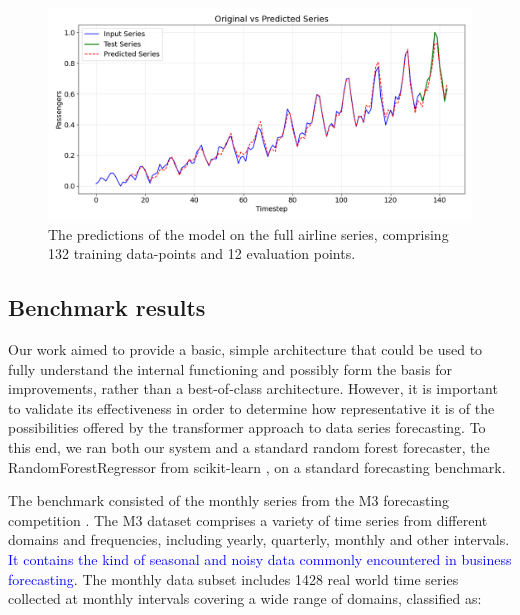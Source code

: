 \documentclass[algorithms,article,submit,pdftex,moreauthors]{Definitions/mdpi}
\begin{document}
\begin{figure}
	\centering
	\includegraphics[width=1.0\linewidth]{airlines.png}
	\caption{The predictions of the model on the full airline series, comprising 132 training data-points and 12 evaluation points.}
	\label{fig:airlines}
\end{figure}

\subsection{Benchmark results} \label{subsec:benchmark}

Our work aimed to provide a basic, simple architecture that could be used to fully understand the internal functioning and possibly form the basis for improvements, rather than a best-of-class architecture. However, it is important to validate its effectiveness in order to determine how representative it is of the possibilities offered by the transformer approach to data series forecasting. To this end, we ran both our system and a standard random forest forecaster, the RandomForestRegressor from scikit-learn \cite{GEW06}, on a standard forecasting benchmark.

The benchmark consisted of the monthly series from the M3 forecasting competition \cite{MH00}. The M3 dataset comprises a variety of time series from different domains and frequencies, including yearly, quarterly, monthly and other intervals. \textcolor{blue}{It contains the kind of seasonal and noisy data commonly encountered in business forecasting}. The monthly data subset includes 1428 real world time series collected at monthly intervals covering a wide range of domains, classified as:
\end{document}
